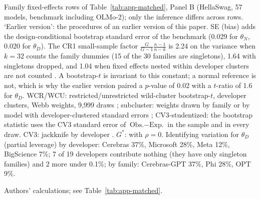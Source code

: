 \begin{table}[tp]
\begin{tablenotes}
Family fixed-effects rows of Table~\ref{tab:app-matched}, Panel B (HellaSwag, 57 models, benchmark including OLMo-2); only the inference differs across rows. `Earlier version': the procedures of an earlier version of this paper. SE (bias) adds the design-conditional bootstrap standard error of the benchmark (0.029 for $\theta_N$, 0.020 for $\theta_D$). The CR1 small-sample factor $\frac{G}{G-1}\frac{n-1}{n-k}$ is 2.24 on the variance when $k=32$ counts the family dummies (15 of the 30 families are singletons), 1.64 with singletons dropped, and 1.04 when fixed effects nested within developer clusters are not counted \citep{cameron2015practitioner}. A bootstrap-$t$ is invariant to this constant; a normal reference is not, which is why the earlier version paired a $p$-value of 0.02 with a $t$-ratio of 1.6 for $\theta_D$. WCR/WCU: restricted/unrestricted wild-cluster bootstrap-$t$, developer clusters, Webb weights, 9,999 draws \citep{cameron2008bootstrap,webb2023reworking}; subcluster: weights drawn by family or by model with developer-clustered standard errors \citep{mackinnon2018wild}; CV3-studentized: the bootstrap statistic uses the CV3 standard error of $\text{Obs.}-\text{Exp.}$ in the sample and in every draw. CV3: jackknife by developer \citep{mackinnon2023cluster}. $G^*$: \citet{carter2017asymptotic} with $\rho=0$. Identifying variation for $\theta_D$ (partial leverage) by developer: Cerebras 37\%, Microsoft 28\%, Meta 12\%, BigScience 7\%; 7 of 19 developers contribute nothing (they have only singleton families) and 2 more under 0.1\%; by family: Cerebras-GPT 37\%, Phi 28\%, OPT 9\%.
\end{tablenotes}
\begin{tablenotes}[Source]
Authors' calculations; see Table~\ref{tab:app-matched}.
\end{tablenotes}
\end{table}
